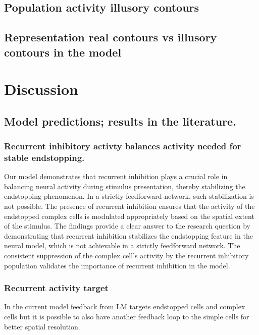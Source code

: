 \documentclass[12pt]{article}
\begin{document}
\subsection{Population activity illusory contours}

\subsection{Representation real contours vs illusory contours in the model}


\newpage
\section{Discussion}

\subsection{Model predictions; results in the literature.}
  \subsubsection{Recurrent inhibitory activty balances activity needed for stable endstopping.}
  Our model demonstrates that recurrent inhibition plays a crucial role in balancing neural activity during stimulus presentation, thereby stabilizing the endstopping phenomenon. In a strictly feedforward network, such stabilization is not possible. The presence of recurrent inhibition ensures that the activity of the endstopped complex cells is modulated appropriately based on the spatial extent of the stimulus. The findings provide a clear answer to the research question by demonstrating that recurrent inhibition stabilizes the endstopping feature in the neural model, which is not achievable in a strictly feedforward network. The consistent suppression of the complex cell's activity by the recurrent inhibitory population validates the importance of recurrent inhibition in the model.

\subsubsection{Recurrent activity target}
In the current model feedback from LM targets endstopped cells and complex cells but it is possible to also have another feedback loop to the simple cells for better spatial resolution. 
\end{document}
